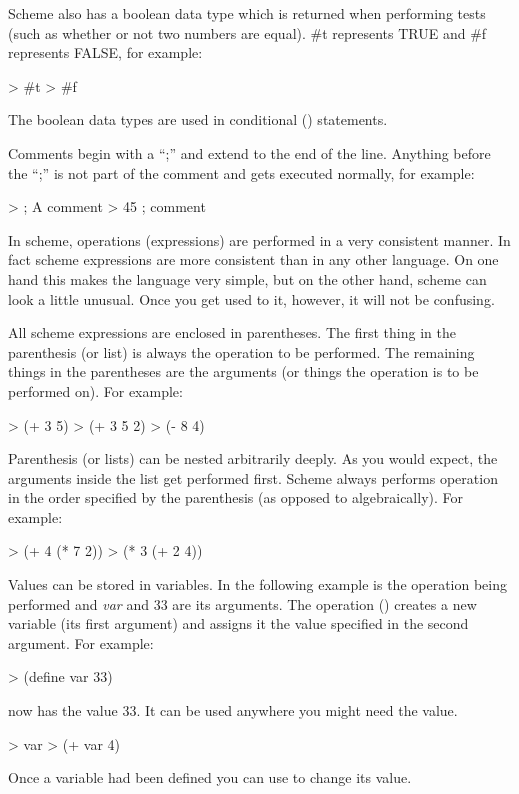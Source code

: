 Scheme also has a boolean data type which is returned when performing
tests (such as whether or not two numbers are equal).  \#t represents
TRUE and \#f represents FALSE, for example:

\begcode
> \#t 
> \#f
\endcode


The boolean data types are used in conditional () statements.

Comments begin with a ``;'' and extend to the end of the line.  Anything
before the ``;'' is not part of the comment and gets executed normally,
for example:

\begcode
> ; A comment
> 45 ; comment
\endcode

In scheme, operations (expressions) are performed in a very consistent
manner. In fact scheme expressions are more consistent than in any
other language.  On one hand this makes the language very simple, but
on the other hand, scheme can look a little unusual.  Once you get
used to it, however, it will not be confusing.

All scheme expressions are enclosed in parentheses.  The first thing
in the parenthesis (or list) is always the operation to be
performed. The remaining things in the parentheses are the arguments
(or things the operation is to be performed on).  For example:

\begcode
> (+ 3 5)
> (+ 3 5 2)
> (- 8 4)
\endcode


Parenthesis (or lists) can be nested arbitrarily deeply.  As you would
expect, the arguments inside the list get performed first.  Scheme
always performs operation in the order specified by the parenthesis
(as opposed to algebraically).  For example:


\begcode
> (+ 4 (* 7 2))
> (* 3 (+ 2 4))
\endcode


Values can be stored in variables.  In the following example  is
the operation being performed and {\it var} and 33 are its arguments.  The
operation () creates a new variable (its first argument) and
assigns it the value specified in the second argument.  For example:


\begcode
> (define var 33)
\endcode

 now has the value 33.  It can be used anywhere you might need the value.

\begcode
> var
> (+ var 4)
\endcode

Once a variable had been defined you can use  to change its value.

